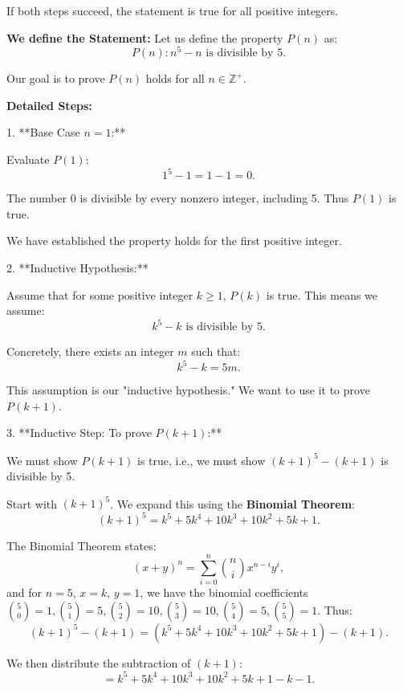 \documentclass[12pt,a4paper]{article}
\begin{document}
If both steps succeed, the statement is true for all positive integers.

\medskip

\noindent\textbf{We define the Statement:}
Let us define the property $P(n)$ as:
\[
P(n): n^5 - n \text{ is divisible by 5.}
\]

Our goal is to prove $P(n)$ holds for all $n \in \mathbb{Z}^+$.

\medskip

\noindent\textbf{Detailed Steps:}

\medskip

1. **Base Case $n=1$:**
\medskip
   
   Evaluate $P(1)$:
   \[
   1^5 - 1 = 1 - 1 = 0.
   \]
   
   The number 0 is divisible by every nonzero integer, including 5. Thus $P(1)$ is true.

   We have established the property holds for the first positive integer.

\medskip

2. **Inductive Hypothesis:**

\medskip
   
   Assume that for some positive integer $k \geq 1$, $P(k)$ is true. This means we assume:
   \[
   k^5 - k \text{ is divisible by 5.}
   \]

   Concretely, there exists an integer $m$ such that:
   \[
   k^5 - k = 5m.
   \]

   This assumption is our "inductive hypothesis." We want to use it to prove $P(k+1)$.

\bigskip

3. **Inductive Step: To prove $P(k+1)$:**
   
\medskip

   We must show $P(k+1)$ is true, i.e., we must show $(k+1)^5 - (k+1)$ is divisible by 5.

   Start with $(k+1)^5$. We expand this using the \textbf{Binomial Theorem}:
   \[
   (k+1)^5 = k^5 + 5k^4 + 10k^3 + 10k^2 + 5k + 1.
   \]

   The Binomial Theorem states:
   \[
   (x+y)^n = \sum_{i=0}^n \binom{n}{i} x^{n-i}y^i,
   \]
   and for $n=5$, $x=k$, $y=1$, we have the binomial coefficients $\binom{5}{0}=1, \binom{5}{1}=5, \binom{5}{2}=10, \binom{5}{3}=10, \binom{5}{4}=5, \binom{5}{5}=1$.
\medskip
   Thus:
   \[
   (k+1)^5 - (k+1) = (k^5 + 5k^4 + 10k^3 + 10k^2 + 5k + 1) - (k+1).
   \]

   We then distribute the subtraction of $(k+1)$:
   \[
   = k^5 + 5k^4 + 10k^3 + 10k^2 + 5k + 1 - k - 1.
   \]
\end{document}
